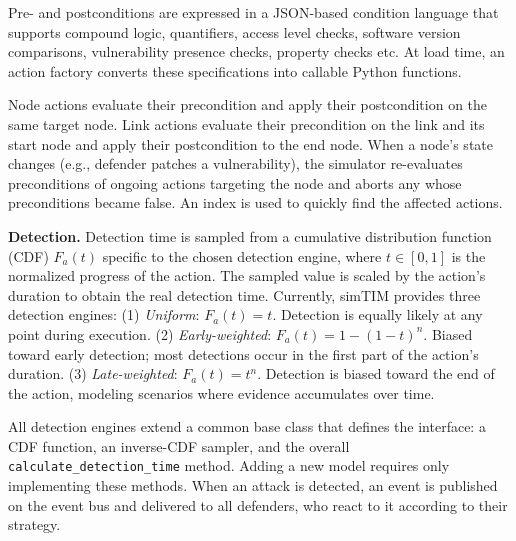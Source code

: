 \documentclass{llncs}
\begin{document}
Pre- and postconditions are expressed in a JSON-based condition language that supports compound logic, quantifiers, access level checks, software version comparisons, vulnerability presence checks, property checks etc. At load time, an action factory converts these specifications into callable Python functions.

Node actions evaluate their precondition and apply their postcondition on the same target node. Link actions evaluate their precondition on the link and its start node and apply their postcondition to the end node.
When a node's state changes (e.g., defender patches a vulnerability), the simulator re-evaluates preconditions of ongoing actions targeting the node and aborts any whose preconditions became false. An index is used to quickly find the affected actions.%

\textbf{Detection.}
Detection time is sampled from a cumulative distribution function (CDF) $F_a(t)$ specific to the chosen detection engine, where $t \in [0,1]$ is the normalized progress of the action. The sampled value is scaled by the action's duration to obtain the real detection time.
Currently, simTIM provides three detection engines:
(1) \emph{Uniform}: $F_a(t) = t$. Detection is equally likely at any point during execution.
(2) \emph{Early-weighted}: $F_a(t) = 1 - (1-t)^n$. Biased toward early detection; most detections occur in the first part of the action's duration.
(3) \emph{Late-weighted}: $F_a(t) = t^n$. Detection is biased toward the end of the action, modeling scenarios where evidence accumulates over time.

All detection engines extend a common base class that defines the interface: a CDF function, an inverse-CDF sampler, and the overall \texttt{calculate\_detection\_time} method. Adding a new model requires only implementing these methods.
When an attack is detected, an event is published on the event bus %
and delivered to all defenders, who %
react to it according to their strategy.
\end{document}
